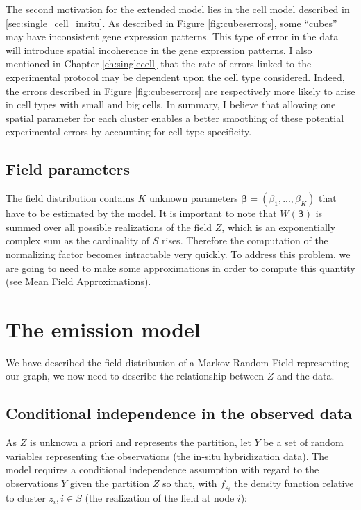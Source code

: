   The second motivation for the extended model lies in the cell model described in \ref{sec:single_cell_insitu}. As described in Figure \ref{fig:cubeserrors}, some ``cubes'' may have inconsistent gene expression patterns. This type of error in the data will introduce spatial incoherence in the gene expression patterns. I also mentioned in Chapter \ref{ch:singlecell} that the rate of errors linked to the experimental protocol may be dependent upon the cell type considered. Indeed, the errors described in Figure \ref{fig:cubeserrors} are respectively more likely to arise in cell types with small and big cells. In summary, I believe that allowing one spatial parameter for each cluster enables a better smoothing of these potential experimental errors by accounting for cell type specificity.\\
 
 \subsection{Field parameters}

The field distribution contains $K$ unknown parameters $\boldsymbol{\beta} = (\beta_{1},...,\beta_{K})$ that have to be estimated by the model. It is important to note that $W(\boldsymbol{\beta})$ is summed over all possible realizations of the field $Z$, which is an exponentially complex sum as the cardinality of $S$ rises. Therefore the computation of the normalizing factor becomes intractable very quickly. To address this problem, we are going to need to make some approximations in order to compute this quantity (see Mean Field Approximations).\\

\section{The emission model}

We have described the field distribution of a Markov Random Field representing our graph, we now need to describe the relationship between $Z$ and the data.

\subsection{Conditional independence in the observed data}
As $Z$ is unknown a priori and represents the partition, let $Y$ be a set of random variables representing the observations (the in-situ hybridization data). The model requires a conditional independence assumption with regard to the observations $Y$ given the partition $Z$ so that, with $f_{z_i}$ the density function relative to cluster $z_i, i \in S$ (the realization of the field at node $i$):

